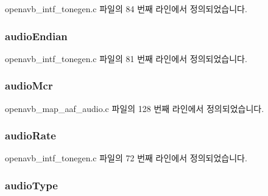 openavb\+\_\+intf\+\_\+tonegen.\+c 파일의 84 번째 라인에서 정의되었습니다.

\subsubsection[{\texorpdfstring{audio\+Endian}{audioEndian}}]{ audio\+Endian}\hypertarget{structpvt__data__t_a2737fc6ab5107802c9fa03d74c967794}{}\label{structpvt__data__t_a2737fc6ab5107802c9fa03d74c967794}


openavb\+\_\+intf\+\_\+tonegen.\+c 파일의 81 번째 라인에서 정의되었습니다.

\subsubsection[{\texorpdfstring{audio\+Mcr}{audioMcr}}]{ audio\+Mcr}\hypertarget{structpvt__data__t_aa6f30f30bdfe69903d6d830130732e4f}{}\label{structpvt__data__t_aa6f30f30bdfe69903d6d830130732e4f}


openavb\+\_\+map\+\_\+aaf\+\_\+audio.\+c 파일의 128 번째 라인에서 정의되었습니다.

\subsubsection[{\texorpdfstring{audio\+Rate}{audioRate}}]{ audio\+Rate}\hypertarget{structpvt__data__t_a98636b12c3c9cafdc6992d03d6f86852}{}\label{structpvt__data__t_a98636b12c3c9cafdc6992d03d6f86852}


openavb\+\_\+intf\+\_\+tonegen.\+c 파일의 72 번째 라인에서 정의되었습니다.

\subsubsection[{\texorpdfstring{audio\+Type}{audioType}}]{ audio\+Type}\hypertarget{structpvt__data__t_abc6ed39d478764b05a886d64d104ce4b}{}\label{structpvt__data__t_abc6ed39d478764b05a886d64d104ce4b}



